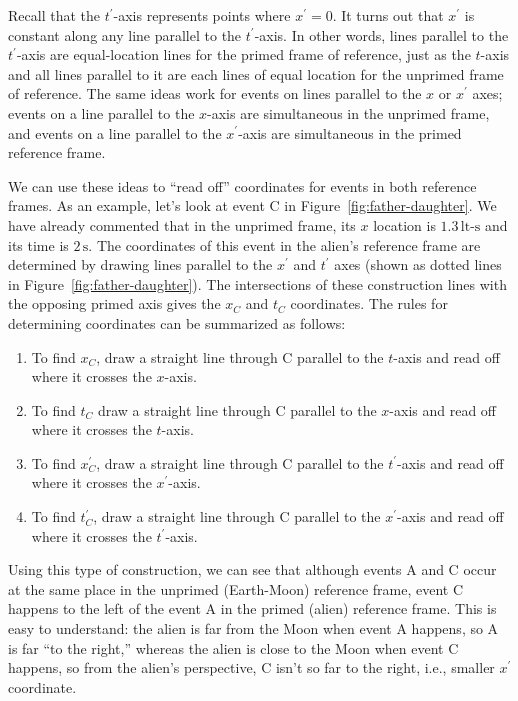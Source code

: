 Recall that the $t^\prime$-axis represents points where $x^\prime =
0$.  It turns out that $x^\prime$ is constant along any line parallel
to the $t^\prime$-axis.  In other words, lines parallel to the $t^\prime$-axis
are equal-location lines for the primed frame of reference, just as
the $t$-axis and all lines parallel to it are each lines of equal
location for the unprimed frame of reference.  The same ideas work for
events on lines parallel to the $x$ or $x^\prime$ axes; events on a line
parallel to the $x$-axis are simultaneous in the unprimed frame, and
events on a line parallel to the $x^\prime$-axis are simultaneous in the
primed reference frame.
    
We can use these ideas to ``read off'' coordinates for events in
both reference frames.  As an example, let's look at event C in
Figure~\ref{fig:father-daughter}.  We have already commented that in the
unprimed frame, its $x$ location is $1.3\,\text{lt-s}$ and its time
is $2\,\text{s}$.  The coordinates of this event in the alien's
reference frame are determined by drawing lines parallel to the
$x^\prime$ and $t^\prime$ axes (shown as dotted lines in
Figure~\ref{fig:father-daughter}).  The intersections of these
construction lines with the opposing primed axis gives the $x_C$ and
$t_C$ coordinates. The rules for determining coordinates can be
summarized as follows:
\begin{enumerate}
\item To find $x_C$, draw a straight line through C parallel to the
$t$-axis and read off where it crosses the $x$-axis.  
\item To find $t_C$ draw a straight line through C parallel to the
$x$-axis and read off where it crosses the $t$-axis.  
\item To find $x_C^\prime$, draw a straight line through C parallel to
the $t^\prime$-axis and read off where it crosses the $x^\prime$-axis.
\item To find $t_C^\prime$, draw a straight line through C parallel to the
$x^\prime$-axis and read off where it crosses the $t^\prime$-axis.
\end{enumerate}

Using this type of construction, we can see that although events A and
C occur at the same place in the unprimed (Earth-Moon) reference
frame, event C happens to the left of the event A in the primed
(alien) reference frame.  This is easy to understand: the alien is far
from the Moon when event A happens, so A is far ``to the right,''
whereas the alien is close to the Moon when event C happens, so from
the alien's perspective, C isn't so far to the right, i.e.,
smaller $x^\prime$ coordinate.
    
